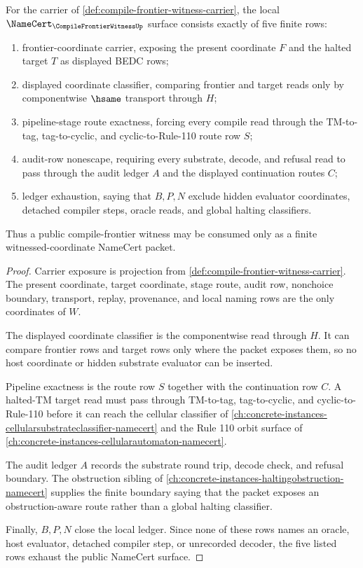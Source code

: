 \begin{theorem}
\label{thm:compile-frontier-witness-namecert-obligations}
For the carrier of \autoref{def:compile-frontier-witness-carrier}, the local $\NameCert_{\CompileFrontierWitnessUp}$ surface consists exactly of five finite rows:
\begin{enumerate}
\item frontier-coordinate carrier, exposing the present coordinate $F$ and the halted target $T$ as displayed BEDC rows;
\item displayed coordinate classifier, comparing frontier and target reads only by componentwise $\hsame$ transport through $H$;
\item pipeline-stage route exactness, forcing every compile read through the TM-to-tag, tag-to-cyclic, and cyclic-to-Rule-110 route row $S$;
\item audit-row nonescape, requiring every substrate, decode, and refusal read to pass through the audit ledger $A$ and the displayed continuation routes $C$;
\item ledger exhaustion, saying that $B,P,N$ exclude hidden evaluator coordinates, detached compiler steps, oracle reads, and global halting classifiers.
\end{enumerate}
Thus a public compile-frontier witness may be consumed only as a finite witnessed-coordinate NameCert packet.
\end{theorem}
\begin{proof}
Carrier exposure is projection from \autoref{def:compile-frontier-witness-carrier}. The present coordinate, target coordinate, stage route, audit row, nonchoice boundary, transport, replay, provenance, and local naming rows are the only coordinates of $W$.

The displayed coordinate classifier is the componentwise read through $H$. It can compare frontier rows and target rows only where the packet exposes them, so no host coordinate or hidden substrate evaluator can be inserted.

Pipeline exactness is the route row $S$ together with the continuation row $C$. A halted-TM target read must pass through TM-to-tag, tag-to-cyclic, and cyclic-to-Rule-110 before it can reach the cellular classifier of \autoref{ch:concrete-instances-cellularsubstrateclassifier-namecert} and the Rule 110 orbit surface of \autoref{ch:concrete-instances-cellularautomaton-namecert}.

The audit ledger $A$ records the substrate round trip, decode check, and refusal boundary. The obstruction sibling of \autoref{ch:concrete-instances-haltingobstruction-namecert} supplies the finite boundary saying that the packet exposes an obstruction-aware route rather than a global halting classifier.

Finally, $B,P,N$ close the local ledger. Since none of these rows names an oracle, host evaluator, detached compiler step, or unrecorded decoder, the five listed rows exhaust the public NameCert surface.
\end{proof}

